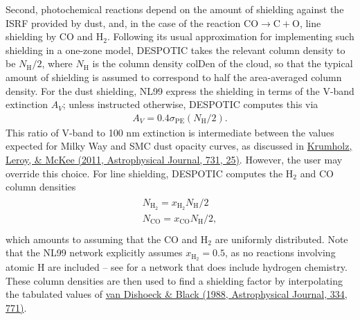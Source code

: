 \documentclass[letterpaper,10pt,english]{sphinxmanual}
\begin{document}
Second, photochemical reactions depend on the amount of shielding
against the ISRF provided by dust, and, in the case of the reaction
\(\mathrm{CO}\rightarrow\mathrm{C}+\mathrm{O}\), line shielding by
CO and \(\mathrm{H}_2\). Following its usual approximation for
implementing such shielding in a one-zone model, DESPOTIC takes the
relevant column density to be \(N_{\mathrm{H}}/2\), where
\(N_\mathrm{H}\) is the column density colDen of the cloud, so
that the typical amount of shielding is assumed to correspond to
half the area-averaged column density. For the dust shielding,
NL99 express the shielding in terms of the V-band extinction
\(A_V\); unless instructed otherwise, DESPOTIC computes this via
\begin{equation*}
\begin{split}A_V = 0.4 \sigma_{\mathrm{PE}}(N_{\mathrm{H}}/2).\end{split}
\end{equation*}
This ratio of V-band to 100 nm extinction is intermediate
between the values expected for Milky Way and SMC dust opacity curves,
as discussed in \href{http://adsabs.harvard.edu/abs/2011ApJ...731...25K}{Krumholz, Leroy, \& McKee (2011, Astrophysical
Journal, 731, 25)}. However, the
user may override this choice. For line shielding, DESPOTIC computes
the \(\mathrm{H}_2\) and CO column densities
\begin{align*}\!\begin{aligned}
N_{\mathrm{H}_2} = x_{\mathrm{H}_2} N_{\mathrm{H}}/2\\
N_\mathrm{CO} = x_\mathrm{CO} N_\mathrm{H} /2,\\
\end{aligned}\end{align*}
which amounts to assuming that the CO and \(\mathrm{H}_2\) are
uniformly distributed. Note that the NL99 network explicitly assumes
\(x_{\mathrm{H}_2} = 0.5\), as no reactions involving atomic H are
included -- see {\hyperref[chemistry:sssec\string-nl99\string-gc]{}} for a network that does include
hydrogen chemistry. These column densities are then used to find a
shielding factor by interpolating the tabulated values of \href{http://adsabs.harvard.edu/abs/1988ApJ...334..771V}{van Dishoeck
\& Black (1988, Astrophysical Journal, 334, 771)}.
\end{document}
